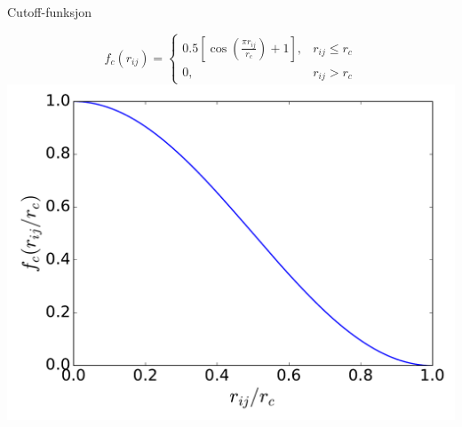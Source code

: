 \documentclass{beamer}
\begin{document}
\begin{frame}

\begin{block}{Cutoff-funksjon}
 
 \begin{equation*}
  f_c(r_{ij}) = 
  \begin{cases}
   0.5 \!\left[\cos\left(\frac{\pi r_{ij}}{r_c}\right) + 1 \right], & r_{ij} \leq r_c \\
   0, & r_{ij} > r_c
  \end{cases}
 \end{equation*}
 \centering
 \includegraphics[width=0.7\linewidth]{../Figures/Presentation/cutoffFunction.pdf}
\end{block}

\end{frame}
\end{document}
